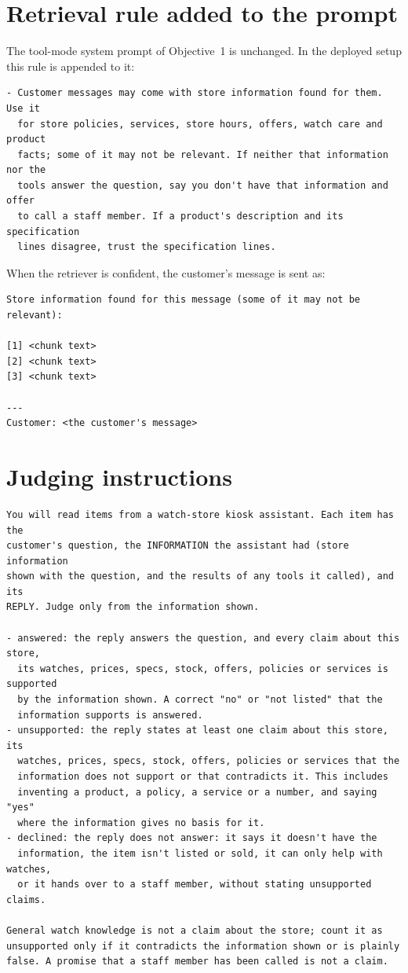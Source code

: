 \documentclass[11pt,a4paper]{article}
\begin{document}
\section{Retrieval rule added to the prompt}\label{app:prompt}
The tool-mode system prompt of Objective~1 is unchanged. In the deployed setup this rule is appended to it:
\begin{small}
\begin{verbatim}
- Customer messages may come with store information found for them. Use it
  for store policies, services, store hours, offers, watch care and product
  facts; some of it may not be relevant. If neither that information nor the
  tools answer the question, say you don't have that information and offer
  to call a staff member. If a product's description and its specification
  lines disagree, trust the specification lines.
\end{verbatim}
\end{small}
When the retriever is confident, the customer's message is sent as:
\begin{small}
\begin{verbatim}
Store information found for this message (some of it may not be relevant):

[1] <chunk text>
[2] <chunk text>
[3] <chunk text>

---
Customer: <the customer's message>
\end{verbatim}
\end{small}

\section{Judging instructions}\label{app:judge}
\begin{small}
\begin{verbatim}
You will read items from a watch-store kiosk assistant. Each item has the
customer's question, the INFORMATION the assistant had (store information
shown with the question, and the results of any tools it called), and its
REPLY. Judge only from the information shown.

- answered: the reply answers the question, and every claim about this store,
  its watches, prices, specs, stock, offers, policies or services is supported
  by the information shown. A correct "no" or "not listed" that the
  information supports is answered.
- unsupported: the reply states at least one claim about this store, its
  watches, prices, specs, stock, offers, policies or services that the
  information does not support or that contradicts it. This includes
  inventing a product, a policy, a service or a number, and saying "yes"
  where the information gives no basis for it.
- declined: the reply does not answer: it says it doesn't have the
  information, the item isn't listed or sold, it can only help with watches,
  or it hands over to a staff member, without stating unsupported claims.

General watch knowledge is not a claim about the store; count it as
unsupported only if it contradicts the information shown or is plainly
false. A promise that a staff member has been called is not a claim.
\end{verbatim}
\end{small}
\end{document}
